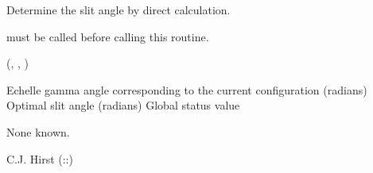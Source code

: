\begin{manroutinedescription}
     Determine the slit angle by direct calculation.

     {} must be called before calling this routine.

     {} {} ({}, {}, {%
})

\begin{manparametertable}
Echelle gamma angle corresponding to the
                                      current configuration (radians)
Optimal slit angle (radians)
 Global status value
\end{manparametertable}
     None known.

     C.J. Hirst  {}  ({}::{})

\end{manroutinedescription}
